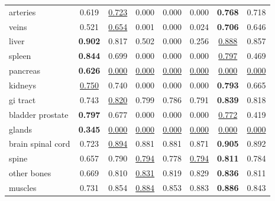 \begin{minipage}{\textwidth}
{\begin{tabular}{@{}lccccccc@{}}
arteries & 0.619 & \underline{0.723} & 0.000 & 0.000 & 0.000 & \textbf{0.768} & 0.718 \\
veins & 0.521 & \underline{0.654} & 0.001 & 0.000 & 0.024 & \textbf{0.706} & 0.646 \\
liver & \textbf{0.902} & 0.817 & 0.502 & 0.000 & 0.256 & \underline{0.888} & 0.857 \\
spleen & \textbf{0.844} & 0.699 & 0.000 & 0.000 & 0.000 & \underline{0.797} & 0.469 \\
pancreas & \textbf{0.626} & \underline{0.000} & \underline{0.000} & \underline{0.000} & \underline{0.000} & \underline{0.000} & \underline{0.000} \\
kidneys & \underline{0.750} & 0.740 & 0.000 & 0.000 & 0.000 & \textbf{0.793} & 0.665 \\
gi tract & 0.743 & \underline{0.820} & 0.799 & 0.786 & 0.791 & \textbf{0.839} & 0.818 \\
bladder prostate & \textbf{0.797} & 0.677 & 0.000 & 0.000 & 0.000 & \underline{0.772} & 0.419 \\
glands & \textbf{0.345} & \underline{0.000} & \underline{0.000} & \underline{0.000} & \underline{0.000} & \underline{0.000} & \underline{0.000} \\
brain spinal cord & 0.723 & \underline{0.894} & 0.881 & 0.881 & 0.871 & \textbf{0.905} & 0.892 \\
spine & 0.657 & 0.790 & \underline{0.794} & 0.778 & \underline{0.794} & \textbf{0.811} & 0.784 \\
other bones & 0.669 & 0.810 & \underline{0.831} & 0.819 & 0.829 & \textbf{0.836} & 0.811 \\
muscles & 0.731 & 0.854 & \underline{0.884} & 0.853 & 0.883 & \textbf{0.886} & 0.843 \\
\bottomrule
\end{tabular}
}\end{minipage}
\par\bigskip
